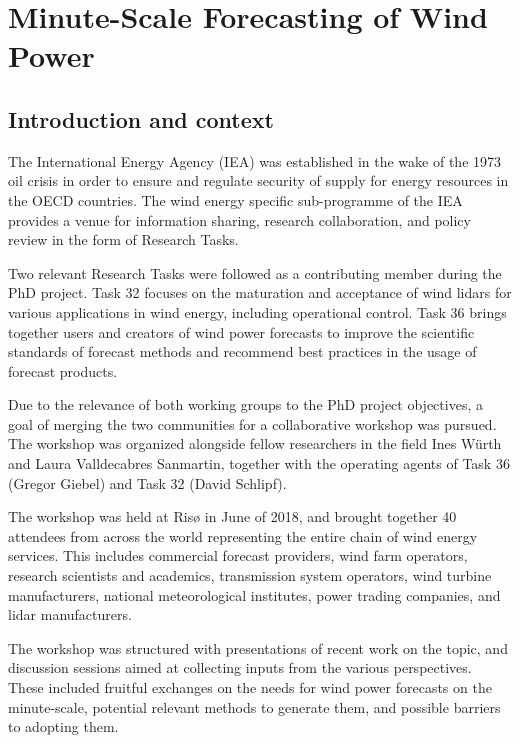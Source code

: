 \chapter{Minute-Scale Forecasting of Wind Power}


\clearpage
\section{Introduction and context}

The International Energy Agency (IEA) was established in the wake of the 1973 oil crisis in order to ensure and regulate security of supply for energy resources in the OECD countries. The wind energy specific sub-programme of the IEA provides a venue for information sharing, research collaboration, and policy review in the form of Research Tasks.

Two relevant Research Tasks were followed as a contributing member during the PhD project.  Task 32 focuses on the maturation and acceptance of wind lidars for various applications in wind energy, including operational control. Task 36 brings together users and creators of wind power forecasts to improve the scientific standards of forecast methods and recommend best practices in the usage of forecast products.

Due to the relevance of both working groups to the PhD project objectives, a goal of merging the two communities for a collaborative workshop was pursued. The workshop was organized alongside fellow researchers in the field Ines W\"urth and Laura Valldecabres Sanmartin, together with the operating agents of Task 36 (Gregor Giebel) and Task 32 (David Schlipf).

The workshop was held at Ris{\o} in June of 2018, and brought together 40 attendees from across the world representing the entire chain of wind energy services.  This includes commercial forecast providers, wind farm operators, research scientists and academics, transmission system operators, wind turbine manufacturers, national meteorological institutes, power trading companies, and lidar manufacturers.

The workshop was structured with presentations of recent work on the topic, and discussion sessions aimed at collecting inputs from the various perspectives. These included fruitful exchanges on the needs for wind power forecasts on the minute-scale, potential relevant methods to generate them, and possible barriers to adopting them. 

